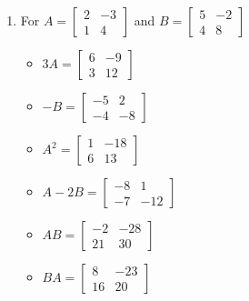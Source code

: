 \documentclass{ximera}
\begin{document}
\begin{enumerate}

\item For  $A = \left[ \begin{array}{rr} 2 & -3 \\ 1 & 4 \end{array} \right]$ and $B=\left[ \begin{array}{rr} 5 & -2 \\ 4 & 8 \end{array} \right]$ 

\begin{multicols}{3}
\begin{itemize}
\item  $3A = \left[ \begin{array}{rr} 6 & -9 \\ 3 & 12 \end{array} \right]$

\item $-B = \left[ \begin{array}{rr} -5 & 2 \\ -4 & -8 \end{array} \right]$

\item $A^2 = \left[ \begin{array}{rr} 1 & -18 \\ 6 & 13 \end{array} \right]$

\end{itemize}
\end{multicols}


\begin{multicols}{3}
\begin{itemize}
\item  $A-2B = \left[ \begin{array}{rr} -8 & 1 \\ -7 & -12 \end{array} \right]$

\item $AB = \left[ \begin{array}{rr} -2 & -28 \\ 21 & 30 \end{array} \right]$

\item $BA = \left[ \begin{array}{rr} 8 & -23 \\ 16 & 20 \end{array} \right]$


\end{itemize}
\end{multicols}
\end{enumerate}
\end{document}

